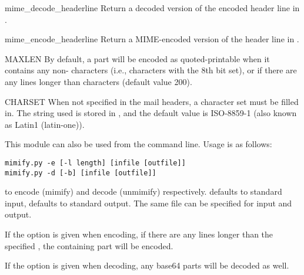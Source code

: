 \begin{funcdesc}{mime_decode_header}{line}
Return a decoded version of the encoded header line in .
\end{funcdesc}

\begin{funcdesc}{mime_encode_header}{line}
Return a MIME-encoded version of the header line in .
\end{funcdesc}

\begin{datadesc}{MAXLEN}
By default, a part will be encoded as quoted-printable when it
contains any non-\ASCII{} characters (i.e., characters with the 8th bit
set), or if there are any lines longer than  characters
(default value 200).  
\end{datadesc}

\begin{datadesc}{CHARSET}
When not specified in the mail headers, a character set must be filled
in.  The string used is stored in , and the default
value is ISO-8859-1 (also known as Latin1 (latin-one)).
\end{datadesc}

This module can also be used from the command line.  Usage is as
follows:
\begin{verbatim}
mimify.py -e [-l length] [infile [outfile]]
mimify.py -d [-b] [infile [outfile]]
\end{verbatim}
to encode (mimify) and decode (unmimify) respectively.  
defaults to standard input,  defaults to standard output.
The same file can be specified for input and output.

If the  option is given when encoding, if there are any lines
longer than the specified , the containing part will be
encoded.

If the  option is given when decoding, any base64 parts will
be decoded as well.

\begin{seealso}
\end{seealso}
